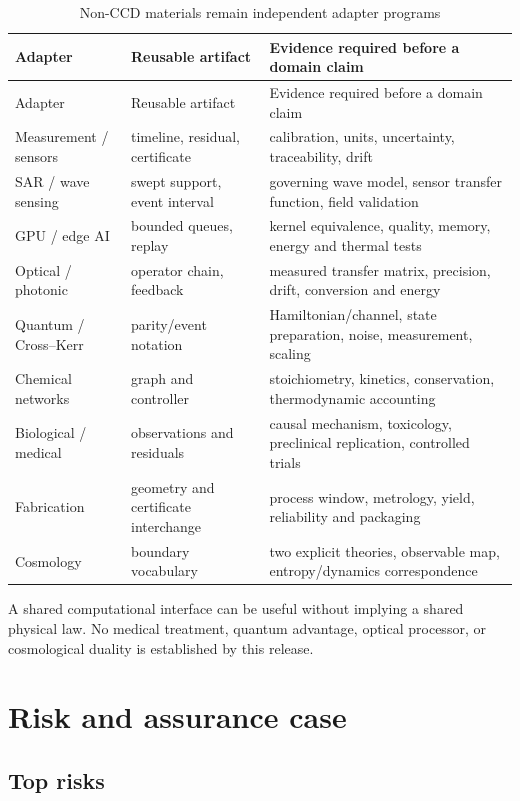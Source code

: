 \documentclass[11pt,a4paper,oneside]{book}
\begin{document}
\begin{longtable}{p{}p{}p{}}
\caption{Non-CCD materials remain independent adapter programs}\\
\toprule
Adapter & Reusable artifact & Evidence required before a domain claim\\
\midrule
\endfirsthead
\toprule
Adapter & Reusable artifact & Evidence required before a domain claim\\
\midrule
\endhead
Measurement / sensors & timeline, residual, certificate & calibration, units, uncertainty, traceability, drift\\
SAR / wave sensing & swept support, event interval & governing wave model, sensor transfer function, field validation\\
GPU / edge AI & bounded queues, replay & kernel equivalence, quality, memory, energy and thermal tests\\
Optical / photonic & operator chain, feedback & measured transfer matrix, precision, drift, conversion and energy\\
Quantum / Cross--Kerr & parity/event notation & Hamiltonian/channel, state preparation, noise, measurement, scaling\\
Chemical networks & graph and controller & stoichiometry, kinetics, conservation, thermodynamic accounting\\
Biological / medical & observations and residuals & causal mechanism, toxicology, preclinical replication, controlled trials\\
Fabrication & geometry and certificate interchange & process window, metrology, yield, reliability and packaging\\
Cosmology & boundary vocabulary & two explicit theories, observable map, entropy/dynamics correspondence\\
\bottomrule
\end{longtable}

A shared computational interface can be useful without implying a shared physical law. No medical treatment, quantum advantage, optical processor, or cosmological duality is established by this release.

\chapter{Risk and assurance case}
\section{Top risks}
\end{document}
